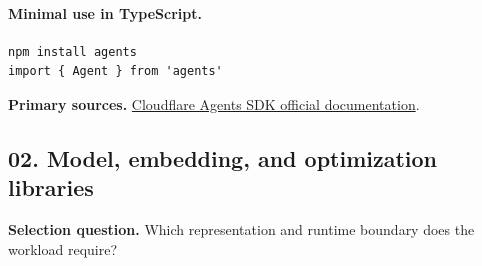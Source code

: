 \paragraph{Minimal use in TypeScript.}
\begin{Verbatim}[fontsize=\scriptsize]
npm install agents
import { Agent } from 'agents'
\end{Verbatim}
\textbf{Primary sources.} \href{https://developers.cloudflare.com/agents/}{Cloudflare Agents SDK official documentation}.
\clearpage\subsection{02. Model, embedding, and optimization libraries}
\textbf{Selection question.} Which representation and runtime boundary does the workload require?
\begin{center}\end{center}
